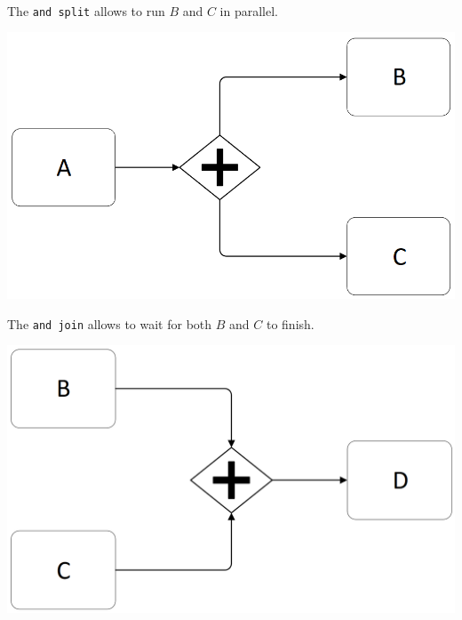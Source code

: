 \begin{description}
        \begin{example} \phantom{}\\
            \begin{minipage}{0.49\textwidth}
                The \texttt{and split} allows to run $B$ and $C$ in parallel.
                \begin{center}
                    \includegraphics[width=0.6\linewidth]{img/bp_control_flow_parallel_split.png}
                \end{center}
            \end{minipage}
            \hspace{0.02\textwidth}
            \begin{minipage}{0.49\textwidth}
                The \texttt{and join} allows to wait for both $B$ and $C$ to finish.
                \begin{center}
                    \includegraphics[width=0.6\linewidth]{img/bp_control_flow_parallel_join.png}
                \end{center}
            \end{minipage}
        \end{example}


\end{description}
